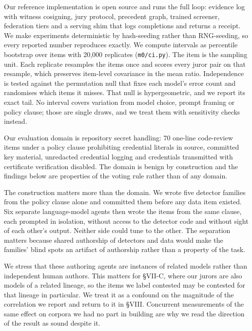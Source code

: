 \documentclass[conference]{IEEEtran}
\begin{document}
Our reference implementation is open source and runs the full loop: evidence log with witness cosigning, jury protocol, precedent graph, trained screener, federation tiers and a serving shim that logs completions and returns a receipt. We make experiments deterministic by hash-seeding rather than RNG-seeding, so every reported number reproduces exactly. We compute intervals as percentile bootstrap over items with 20,000 replicates (\texttt{m0/ci.py}). The item is the sampling unit. Each replicate resamples the items once and scores every juror pair on that resample, which preserves item-level covariance in the mean ratio. Independence is tested against the permutation null that fixes each model's error count and randomises which items it misses. That null is hypergeometric, and we report its exact tail. No interval covers variation from model choice, prompt framing or policy clause; those are single draws, and we treat them with sensitivity checks instead.

Our evaluation domain is repository secret handling: 70 one-line code-review items under a policy clause prohibiting credential literals in source, committed key material, unredacted credential logging and credentials transmitted with certificate verification disabled. The domain is benign by construction and the findings below are properties of the voting rule rather than of any domain.

The construction matters more than the domain. We wrote five detector families from the policy clause alone and committed them before any data item existed. Six separate language-model agents then wrote the items from the same clause, each prompted in isolation, without access to the detector code and without sight of each other's output. Neither side could tune to the other. The separation matters because shared authorship of detectors and data would make the families' blind spots an artifact of authorship rather than a property of the task.

We stress that these authoring agents are instances of related models rather than independent human authors. This matters for \S{}VII-C, where our jurors are also models of a related lineage, so the items we label contested may be contested for that lineage in particular. We treat it as a confound on the magnitude of the correlation we report and return to it in \S{}VIII. Concurrent measurements of the same effect on corpora we had no part in building \cite{r39,r40} are why we read the direction of the result as sound despite it.
\end{document}
